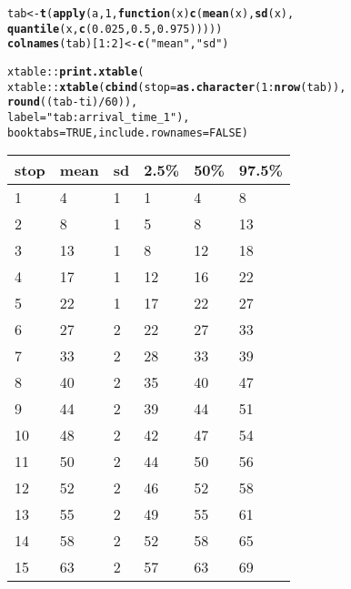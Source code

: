 \documentclass[11pt]{article}\usepackage[]{graphicx}\usepackage[]{color}
\makeatletter
\newcommand{\hlnum}[1]{\textcolor[rgb]{0.686,0.059,0.569}{#1}}%
\newcommand{\hlstr}[1]{\textcolor[rgb]{0.192,0.494,0.8}{#1}}%
\newcommand{\hlopt}[1]{\textcolor[rgb]{0,0,0}{#1}}%
\newcommand{\hlstd}[1]{\textcolor[rgb]{0.345,0.345,0.345}{#1}}%
\newcommand{\hlkwa}[1]{\textcolor[rgb]{0.161,0.373,0.58}{\textbf{#1}}}%
\newcommand{\hlkwb}[1]{\textcolor[rgb]{0.69,0.353,0.396}{#1}}%
\newcommand{\hlkwc}[1]{\textcolor[rgb]{0.333,0.667,0.333}{#1}}%
\newcommand{\hlkwd}[1]{\textcolor[rgb]{0.737,0.353,0.396}{\textbf{#1}}}%
\newenvironment{kframe}{%
 \def\at@end@of@kframe{}%
 \ifinner\ifhmode%
  \def\at@end@of@kframe{\end{minipage}}%
  \begin{minipage}{\columnwidth}%
 \fi\fi%
 \def\FrameCommand##1{\hskip\@totalleftmargin \hskip-\fboxsep
 \colorbox{shadecolor}{##1}\hskip-\fboxsep
     \hskip-\linewidth \hskip-\@totalleftmargin \hskip\columnwidth}%
 \MakeFramed {\advance\hsize-\width
   \@totalleftmargin\z@ \linewidth\hsize
   \@setminipage}}%
 {\par\unskip\endMakeFramed%
 \at@end@of@kframe}
\makeatother
\begin{document}
\begin{kframe}
\begin{alltt}
\hlstd{tab} \hlkwb{<-} \hlkwd{t}\hlstd{(}\hlkwd{apply}\hlstd{(a,} \hlnum{1}\hlstd{,} \hlkwa{function}\hlstd{(}\hlkwc{x}\hlstd{)} \hlkwd{c}\hlstd{(}\hlkwd{mean}\hlstd{(x),} \hlkwd{sd}\hlstd{(x),}
                                   \hlkwd{quantile}\hlstd{(x,} \hlkwd{c}\hlstd{(}\hlnum{0.025}\hlstd{,} \hlnum{0.5}\hlstd{,} \hlnum{0.975}\hlstd{)))))}
\hlkwd{colnames}\hlstd{(tab)[}\hlnum{1}\hlopt{:}\hlnum{2}\hlstd{]} \hlkwb{<-} \hlkwd{c}\hlstd{(}\hlstr{"mean"}\hlstd{,} \hlstr{"sd"}\hlstd{)}

\hlstd{xtable}\hlopt{::}\hlkwd{print.xtable}\hlstd{(}
    \hlstd{xtable}\hlopt{::}\hlkwd{xtable}\hlstd{(}\hlkwd{cbind}\hlstd{(}\hlkwc{stop} \hlstd{=} \hlkwd{as.character}\hlstd{(}\hlnum{1}\hlopt{:}\hlkwd{nrow}\hlstd{(tab)),}
                         \hlkwd{round}\hlstd{((tab} \hlopt{-} \hlstd{ti)} \hlopt{/} \hlnum{60}\hlstd{)),}
                   \hlkwc{label} \hlstd{=} \hlstr{"tab:arrival_time_1"}\hlstd{),}
    \hlkwc{booktabs} \hlstd{=} \hlnum{TRUE}\hlstd{,} \hlkwc{include.rownames} \hlstd{=} \hlnum{FALSE}\hlstd{)}
\end{alltt}
\end{kframe}%
\begin{table}[ht]
\centering
\begin{tabular}{llllll}
  \toprule
stop & mean & sd & 2.5\% & 50\% & 97.5\% \\ 
  \midrule
1 & 4 & 1 & 1 & 4 & 8 \\ 
  2 & 8 & 1 & 5 & 8 & 13 \\ 
  3 & 13 & 1 & 8 & 12 & 18 \\ 
  4 & 17 & 1 & 12 & 16 & 22 \\ 
  5 & 22 & 1 & 17 & 22 & 27 \\ 
  6 & 27 & 2 & 22 & 27 & 33 \\ 
  7 & 33 & 2 & 28 & 33 & 39 \\ 
  8 & 40 & 2 & 35 & 40 & 47 \\ 
  9 & 44 & 2 & 39 & 44 & 51 \\ 
  10 & 48 & 2 & 42 & 47 & 54 \\ 
  11 & 50 & 2 & 44 & 50 & 56 \\ 
  12 & 52 & 2 & 46 & 52 & 58 \\ 
  13 & 55 & 2 & 49 & 55 & 61 \\ 
  14 & 58 & 2 & 52 & 58 & 65 \\ 
  15 & 63 & 2 & 57 & 63 & 69 \\ 
   \bottomrule
\end{tabular}
\label{tab:arrival_time_1}
\end{table}
\end{document}
